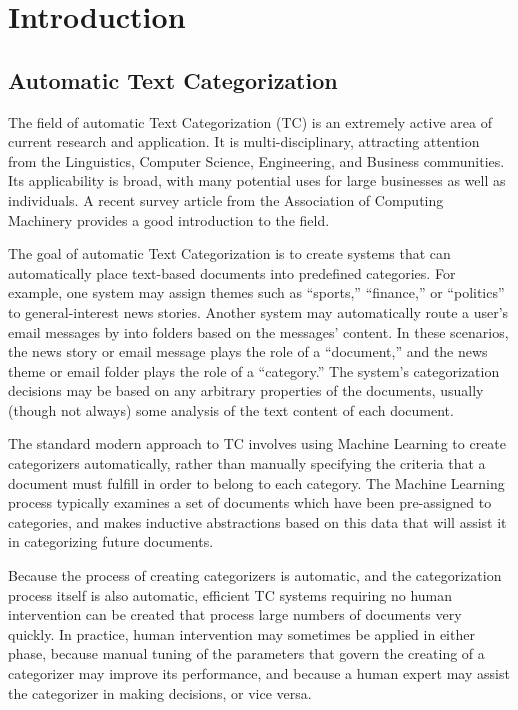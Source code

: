 \chapter{Introduction}
\label{intro}

\section{Automatic Text Categorization}
\label{tc-intro}

The field of automatic Text Categorization (TC) is an extremely active
area of current research and application.  It is multi-disciplinary,
attracting attention from the Linguistics, Computer Science,
Engineering, and Business communities.  Its applicability is broad,
with many potential uses for large businesses as well as individuals.
A recent survey article from the Association of Computing Machinery
provides a good introduction to the field. \cite{sebastiani:02}

The goal of automatic Text Categorization is to create systems that
can automatically place text-based documents into predefined
categories.  For example, one system may assign themes such as
``sports,'' ``finance,'' or ``politics'' to general-interest news
stories.  Another system may automatically route a user's email
messages by into folders based on the messages' content.  In these
scenarios, the news
story or email message plays the role of a ``document,'' and the news
theme or email folder plays the role of a ``category.''  The system's
categorization decisions may be based on any arbitrary properties of
the documents, usually (though not always) some analysis of the text
content of each document.

The standard modern approach to TC involves using Machine Learning to
create categorizers automatically, rather than manually specifying the
criteria that a document must fulfill in order to belong to each
category. \cite[p. 2]{sebastiani:02} The Machine Learning process
typically examines a set of documents which have
been pre-assigned to categories, and makes inductive abstractions
based on this data that will assist it in categorizing future
documents. \cite[sec. 2.7]{mitchell:97}

Because the process of creating categorizers is automatic, and the
categorization process itself is also automatic, efficient TC systems
requiring no human intervention can be created that process large
numbers of documents very quickly.  In practice, human intervention
may sometimes be applied in either phase, because manual tuning of the
parameters that govern the creating of a categorizer may improve its
performance, and because a human expert may assist the categorizer in
making decisions, or vice versa.

